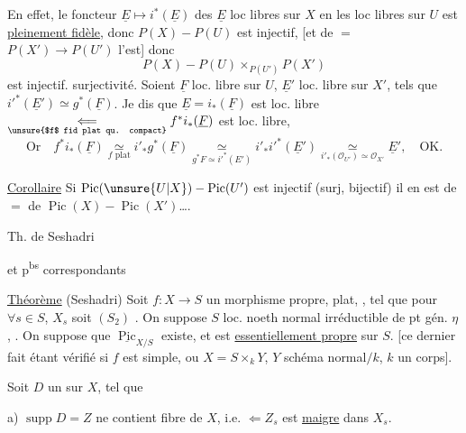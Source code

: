 En effet,  le foncteur $\underline E\longmapsto i^*(\underline E)$ des $\underline E$ loc libres sur $X$ en les  loc libres sur $U$ est \uline{pleinement fidèle}, donc $P(X)\mathbin{-}P(U)$ est injectif, [et de $=$ $P(X')\longrightarrow P(U')$ l'est] donc
\[
 P(X)\mathbin{-}P(U)\mathop{\times}_{P(U')}P(X')
\]
est injectif.   surjectivité. Soient $\underline F$ loc. libre sur $U$, $\underline E'$ loc. libre sur $X'$, tels que $i'^*(\underline E')\simeq g^*(\underline F)$. Je dis que $\underline E=i_*(\underline F)$ est loc. libre $\underset{\text{\unsure{$f$ fid plat qu. compact}}}{\Longleftarrow} f^*i_*(\underline F)$ est loc. libre,
\[
 \text{Or}\quad f^*i_*(\underline F)\underset{f\text{ plat}}{\simeq}i'_*g^*(\underline F)\underset{g^*F\simeq i'^*(E')}{\simeq}i'_*i'^*(\underline E')\underset{i'_*(\mathcal O_{U'})\simeq\mathcal O_{X'}}{\simeq}\underline E',\quad \text{OK.}
\]

\uline{Corollaire} Si $\operatorname{Pic}(\unsure{U|X})\mathbin{-}\operatorname{Pic}(U')$ est injectif (surj, bijectif) il en est de $=$ de $\operatorname{Pic}(X)\mathbin{-}\operatorname{Pic}(X')$\ldots.

Th. de Seshadri

et p\textsuperscript{bs} correspondants

\uline{Théorème} (Seshadri) Soit $f:X\longrightarrow S$ un morphisme propre, plat, , tel que pour $\forall s\in S$,  $X_s$ soit $(S_2)$ . On suppose $S$ loc. noeth normal irréductible de pt gén. $\eta$, . On suppose que $\underline{\operatorname{Pic}}_{X/S}$ existe, et est \uline{essentiellement propre} sur $S$. [ce dernier fait étant vérifié si $f$ est simple, ou $X=S\times_kY$, $Y$ schéma normal$/k$, $k$ un corps].

Soit $D$ un   sur $X$, tel que

a) $\operatorname{supp}D=Z$ ne contient  \deleted{\unsure{$\eta$}}   fibre de $X$, i.e. $\Leftarrow Z_s$ est \uline{maigre} dans $X_s$.

